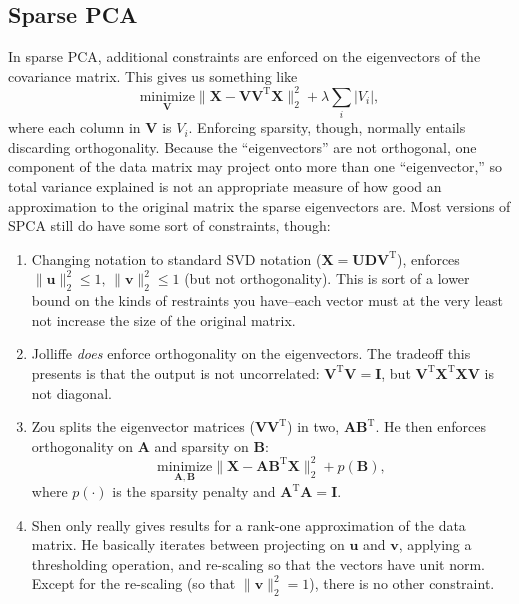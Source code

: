 \documentclass{article}
\newcommand{\transpose}{^\mathrm{T}}
\begin{document}
\subsection*{Sparse PCA}
In sparse PCA, additional constraints are enforced on the eigenvectors of the covariance matrix.  This gives us something like 
\begin{equation}
\underset{\mathbf{V}}{\text{minimize}} \| \mathbf{X} - \mathbf{VV}^{\mathrm{T}}\mathbf{X}\|_2^2  + \lambda \sum_i \vert V_i \vert,
\end{equation}
where each column in $\mathbf{V}$ is $V_i$. Enforcing sparsity, though, normally entails discarding orthogonality.  Because the ``eigenvectors'' are not orthogonal, one component of the data matrix may project onto more than one ``eigenvector,'' so total variance explained is not an appropriate measure of how good an approximation to the original matrix the sparse eigenvectors are.   Most versions of SPCA still do have some sort of constraints, though: 
\begin{enumerate}
\item Changing notation to standard SVD notation ($\mathbf{X} = \mathbf{UDV}^{\mathrm{T}}$), \cite{witten_penalized_2009} enforces $\|\mathbf{u}\|_2^2 \leq 1, \, \|\mathbf{v}\|_2^2 \leq 1$ (but not orthogonality). This is sort of a lower bound on the kinds of restraints you have--each vector must at the very least not increase the size of the original matrix. 
\item Jolliffe \cite{jolliffe_simplified_2000} \textit{does} enforce orthogonality on the eigenvectors.  The tradeoff this presents is that the output is not uncorrelated: $\mathbf{V}^{\mathrm{T}} \mathbf{V} = \mathbf{I}$, but $\mathbf{V}\transpose\mathbf{X}^{\mathrm{T}} \mathbf{XV}$ is not diagonal. 
\item Zou \cite{zou_sparse_2006} splits the eigenvector matrices ($\mathbf{VV}\transpose$) in two, $\mathbf{AB}\transpose$.  He then enforces orthogonality on $\mathbf{A}$ and sparsity on $\mathbf{B}$: 
\begin{equation}
\underset{\mathbf{A}, \mathbf{B}}{\text{minimize}} \| \mathbf{X} - \mathbf{A}\mathbf{B}\transpose \mathbf{X}\|_2^2 + p\left(\mathbf{B}\right),
\end{equation}
where $p\left(\cdot\right)$ is the sparsity penalty and $\mathbf{A}\transpose\mathbf{A} = \mathbf{I}$. 
\item Shen \cite{shen_sparse_2008} only really gives results for a rank-one approximation of the data matrix.  He basically iterates between projecting on $\mathbf{u}$ and $\mathbf{v}$, applying a thresholding operation, and re-scaling so that the vectors have unit norm.  Except for the re-scaling (so that $\|\mathbf{v}\|_2^2 = 1$), there is no other constraint.
\end{enumerate}
\end{document}
